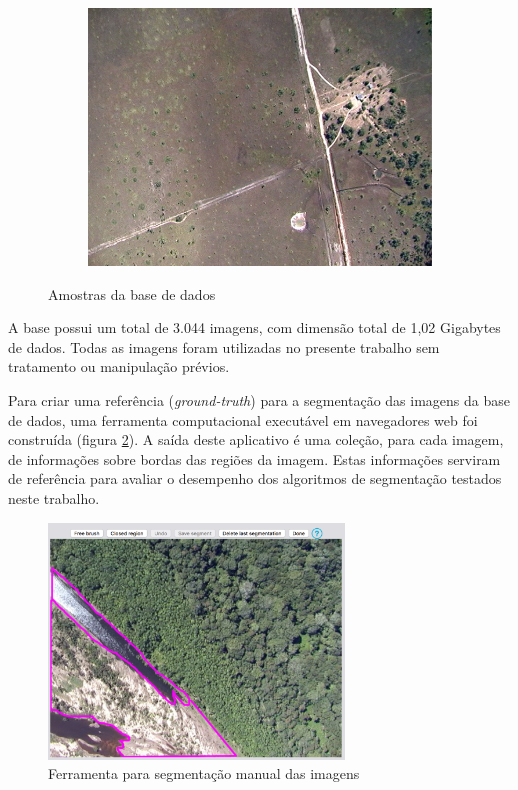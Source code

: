 \begin{figure}[h]
\begin{subfigure}[b]{0.3\textwidth}
    \includegraphics[width=\textwidth]{imgs/amostra3}
  \end{subfigure}%
  \caption{Amostras da base de dados}
  \label{fig:amostra}
\end{figure}

A base possui um total de 3.044 imagens, com dimensão total de 1,02 Gigabytes de dados. Todas as imagens foram utilizadas no presente trabalho sem tratamento ou manipulação prévios.

Para criar uma referência (\textit{ground-truth}) para a segmentação das imagens da base de dados, uma ferramenta computacional executável em navegadores web foi construída (figura \ref{fig:manualseg}). A saída deste aplicativo é uma coleção, para cada imagem, de informações sobre bordas das regiões da imagem. Estas informações serviram de referência para avaliar o desempenho dos algoritmos de segmentação testados neste trabalho.

\begin{figure}[h]
  \centering
  \includegraphics[width=0.7\textwidth]{imgs/manualseg}
  \caption{Ferramenta para segmentação manual das imagens}
  \label{fig:manualseg}
\end{figure}

